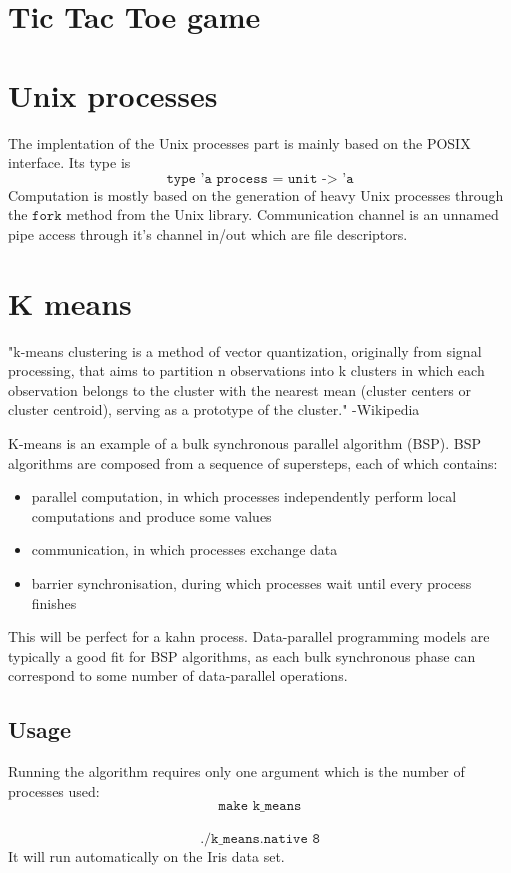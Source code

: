 \documentclass{article}
\begin{document}
\section{Tic Tac Toe game}


\section{Unix processes}
The implentation of the Unix processes part is mainly based on the POSIX interface. Its type is $$\texttt{type 'a process = unit -> 'a}$$
Computation is mostly based on the generation of heavy Unix processes through the $\texttt{fork}$ method from the Unix library.
Communication channel is an unnamed pipe access through it's channel in/out which are file descriptors.

\section{K means}

"k-means clustering is a method of vector quantization, originally from signal processing, that aims to partition n observations into k clusters in which each observation belongs to the cluster with the nearest mean (cluster centers or cluster centroid), serving as a prototype of the cluster." 
-Wikipedia

K-means is an example of a bulk synchronous parallel algorithm (BSP). BSP algorithms are composed from a sequence of supersteps, each of which contains:
\begin{itemize}
    \item parallel computation, in which processes independently perform local computations and produce some values
    \item communication, in which processes exchange data
    \item barrier synchronisation, during which processes wait until every process finishes

\end{itemize}



This will be perfect for a kahn process.
Data-parallel programming models are typically a good fit for BSP algorithms, as each bulk synchronous phase can correspond to some number of data-parallel operations.


\subsection{Usage}

Running the algorithm requires only one argument which is the number of processes used: $$\texttt{make k\_means}$$ \\ $$\texttt{./k\_means.native 8}$$ 
It will run automatically on the Iris data set. 
\end{document}
